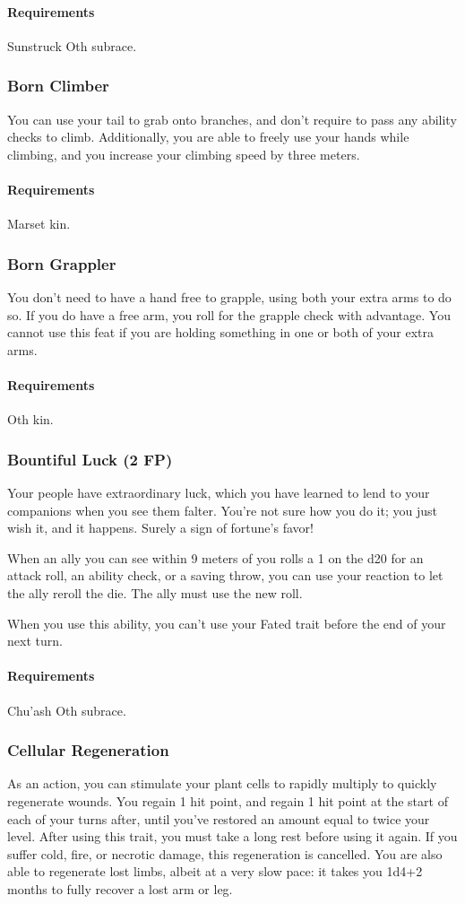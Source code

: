     \paragraph{Requirements} Sunstruck Oth subrace.
\subsubsection{Born Climber} \label{feat::bornclimber}
    You can use your tail to grab onto branches, and don't require to pass any ability checks to climb.
    Additionally, you are able to freely use your hands while climbing, and you increase your climbing speed by three meters.
    \paragraph{Requirements} Marset kin.
\subsubsection{Born Grappler} \label{feat::borngrappler}
    You don't need to have a hand free to grapple, using both your extra arms to do so.
    If you do have a free arm, you roll for the grapple check with advantage.
    You cannot use this feat if you are holding something in one or both of your extra arms.
    \paragraph{Requirements} Oth kin.
\subsubsection{Bountiful Luck (2 FP)} \label{feat::bountifulluck}
    Your people have extraordinary luck, which you have learned to lend to your companions when you see them falter.
    You're not sure how you do it; you just wish it, and it happens.
    Surely a sign of fortune's favor!

    When an ally you can see within 9 meters of you rolls a 1 on the d20 for an attack roll, an ability check, or a saving throw, you can use your reaction to let the ally reroll the die.
    The ally must use the new roll.

    When you use this ability, you can't use your Fated trait before the end of your next turn.
    \paragraph{Requirements} Chu'ash Oth subrace.
\subsubsection{Cellular Regeneration} \label{feat::cellularregeneration}
    As an action, you can stimulate your plant cells to rapidly multiply to quickly regenerate wounds.
    You regain 1 hit point, and regain 1 hit point at the start of each of your turns after, until you've restored an amount equal to twice your level.
    After using this trait, you must take a long rest before using it again.
    If you suffer cold, fire, or necrotic damage, this regeneration is cancelled.
    You are also able to regenerate lost limbs, albeit at a very slow pace: it takes you 1d4+2 months to fully recover a lost arm or leg.
